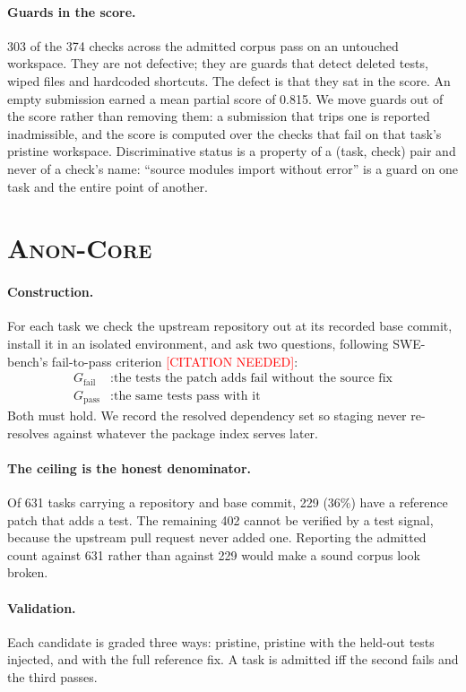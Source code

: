 \documentclass[11pt]{article}
\newcommand{\core}{\textsc{Anon-Core}}
\newcommand{\core}{\textsc{TeamBench-Core}}
\newcommand{\todo}[1]{\textcolor{red}{[#1]}}
\newcommand{\cn}{\todo{CITATION NEEDED}}
\begin{document}
\paragraph{Guards in the score.} 303 of the 374 checks across the admitted
corpus pass on an untouched workspace. They are not defective; they are guards
that detect deleted tests, wiped files and hardcoded shortcuts. The defect is
that they sat in the score. An empty submission earned a mean partial score of
0.815. We move guards out of the score rather than removing them: a submission
that trips one is reported inadmissible, and the score is computed over the
checks that fail on that task's pristine workspace. Discriminative status is a
property of a (task, check) pair and never of a check's name: ``source modules
import without error'' is a guard on one task and the entire point of another.

\section{\core{}}
\label{sec:core}

\paragraph{Construction.} For each task we check the upstream repository out at
its recorded base commit, install it in an isolated environment, and ask two
questions, following SWE-bench's fail-to-pass criterion \cn:
\begin{align*}
G_{\text{fail}} &: \text{the tests the patch adds fail without the source fix} \\
G_{\text{pass}} &: \text{the same tests pass with it}
\end{align*}
Both must hold. We record the resolved dependency set so staging never
re-resolves against whatever the package index serves later.

\paragraph{The ceiling is the honest denominator.} Of 631 tasks carrying a
repository and base commit, 229 (36\%) have a reference patch that adds a test.
The remaining 402 cannot be verified by a test signal, because the upstream pull
request never added one. Reporting the admitted count against 631 rather than
against 229 would make a sound corpus look broken.

\paragraph{Validation.} Each candidate is graded three ways: pristine, pristine
with the held-out tests injected, and with the full reference fix. A task is
admitted iff the second fails and the third passes.
\end{document}
